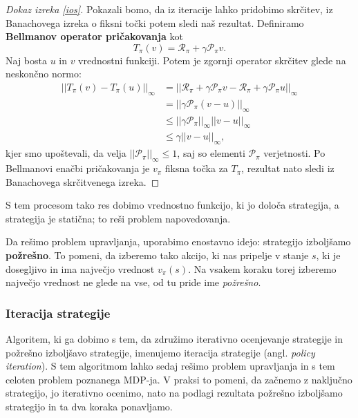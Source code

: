 \documentclass[12pt,a4paper]{amsart}
\theoremstyle{definition} %
\theoremstyle{plain} %
\begin{document}
\begin{proof}[Dokaz izreka \ref{ios}]
    Pokazali bomo, da iz iteracije lahko pridobimo skrčitev, iz Banachovega izreka o fiksni točki 
    potem sledi naš rezultat.
    Definiramo \textbf{Bellmanov operator pričakovanja} kot 
    $$
    T_\pi(v) = \mathcal{R}_\pi + \gamma \mathcal{P}_\pi v.
    $$
    Naj bosta $u$ in $v$ vrednostni funkciji. Potem je zgornji operator skrčitev glede na neskončno 
    normo: 
    \begin{align*}
        ||T_\pi(v) - T_\pi(u)||_\infty &= ||\mathcal{R}_\pi + \gamma \mathcal{P}_\pi v - 
                                            \mathcal{R}_\pi + \gamma \mathcal{P}_\pi u||_\infty \\  
        &= ||\gamma \mathcal{P}_\pi (v - u)||_\infty \\
        &\leq ||\gamma \mathcal{P}_\pi||_\infty ||v - u||_\infty \\
        &\leq \gamma ||v - u||_\infty,
    \end{align*}
    kjer smo upoštevali, da velja $||\mathcal{P}_\pi||_\infty \leq 1$, saj so elementi 
    $\mathcal{P}_\pi$ verjetnosti. Po Bellmanovi enačbi pričakovanja je $v_\pi$ fiksna točka 
    za $T_\pi$, rezultat nato sledi iz Banachovega skrčitvenega izreka.
\end{proof}

S tem procesom tako res dobimo vrednostno funkcijo, ki jo določa strategija, a strategija je 
statična; to reši problem napovedovanja. 

Da rešimo problem upravljanja, uporabimo enostavno idejo: strategijo izboljšamo \textbf{požrešno}. 
To pomeni, da izberemo tako akcijo, ki nas pripelje v stanje $s$, ki je dosegljivo in ima največjo 
vrednost $v_\pi(s)$. Na vsakem koraku torej izberemo največjo vrednost ne glede na vse, od tu pride 
ime \textit{požrešno}.

\subsubsection{Iteracija strategije}
Algoritem, ki ga dobimo s tem, da združimo iterativno ocenjevanje strategije in požrešno izboljšavo 
strategije, imenujemo iteracija strategije (angl. \textit{policy iteration}). S tem algoritmom 
lahko sedaj rešimo problem upravljanja in s tem celoten problem poznanega MDP-ja. V praksi to pomeni, 
da začnemo z naključno strategijo, jo iterativno ocenimo, nato na podlagi rezultata požrešno izboljšamo 
strategijo in ta dva koraka ponavljamo.
\end{document}
